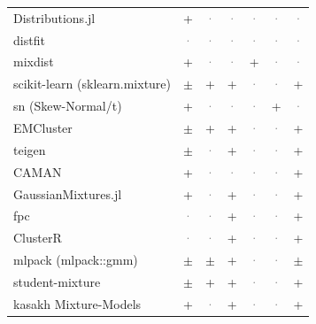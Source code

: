 \documentclass[10pt,a4paper]{article}
\begin{document}
\begin{landscape}
{\begin{longtable}{@{}l *{6}{c}@{}}
Distributions.jl & \cellcolor{yes!35}+ & \textcolor{gray}{·} & \textcolor{gray}{·} & \textcolor{gray}{·} & \textcolor{gray}{·} & \textcolor{gray}{·} \\
distfit & \textcolor{gray}{·} & \textcolor{gray}{·} & \textcolor{gray}{·} & \textcolor{gray}{·} & \textcolor{gray}{·} & \textcolor{gray}{·} \\
mixdist & \cellcolor{yes!35}+ & \textcolor{gray}{·} & \textcolor{gray}{·} & \cellcolor{yes!35}+ & \textcolor{gray}{·} & \textcolor{gray}{·} \\
scikit-learn (sklearn.mixture) & \cellcolor{part!45}$\pm$ & \cellcolor{yes!35}+ & \cellcolor{yes!35}+ & \textcolor{gray}{·} & \textcolor{gray}{·} & \cellcolor{yes!35}+ \\
sn (Skew-Normal/t) & \cellcolor{yes!35}+ & \textcolor{gray}{·} & \textcolor{gray}{·} & \textcolor{gray}{·} & \cellcolor{yes!35}+ & \textcolor{gray}{·} \\
EMCluster & \cellcolor{part!45}$\pm$ & \cellcolor{yes!35}+ & \cellcolor{yes!35}+ & \textcolor{gray}{·} & \textcolor{gray}{·} & \cellcolor{yes!35}+ \\
teigen & \cellcolor{part!45}$\pm$ & \textcolor{gray}{·} & \cellcolor{yes!35}+ & \textcolor{gray}{·} & \textcolor{gray}{·} & \cellcolor{yes!35}+ \\
CAMAN & \cellcolor{yes!35}+ & \textcolor{gray}{·} & \textcolor{gray}{·} & \textcolor{gray}{·} & \textcolor{gray}{·} & \cellcolor{yes!35}+ \\
GaussianMixtures.jl & \cellcolor{yes!35}+ & \textcolor{gray}{·} & \cellcolor{yes!35}+ & \textcolor{gray}{·} & \textcolor{gray}{·} & \cellcolor{yes!35}+ \\
fpc & \textcolor{gray}{·} & \textcolor{gray}{·} & \cellcolor{yes!35}+ & \textcolor{gray}{·} & \textcolor{gray}{·} & \cellcolor{yes!35}+ \\
ClusterR & \textcolor{gray}{·} & \textcolor{gray}{·} & \cellcolor{yes!35}+ & \textcolor{gray}{·} & \textcolor{gray}{·} & \cellcolor{yes!35}+ \\
mlpack (mlpack::gmm) & \cellcolor{part!45}$\pm$ & \cellcolor{part!45}$\pm$ & \cellcolor{yes!35}+ & \textcolor{gray}{·} & \textcolor{gray}{·} & \cellcolor{part!45}$\pm$ \\
student-mixture & \cellcolor{part!45}$\pm$ & \cellcolor{yes!35}+ & \cellcolor{yes!35}+ & \textcolor{gray}{·} & \textcolor{gray}{·} & \cellcolor{yes!35}+ \\
kasakh Mixture-Models & \cellcolor{yes!35}+ & \textcolor{gray}{·} & \cellcolor{yes!35}+ & \textcolor{gray}{·} & \textcolor{gray}{·} & \cellcolor{yes!35}+ \\

\end{longtable}}
\end{landscape}
\end{document}
